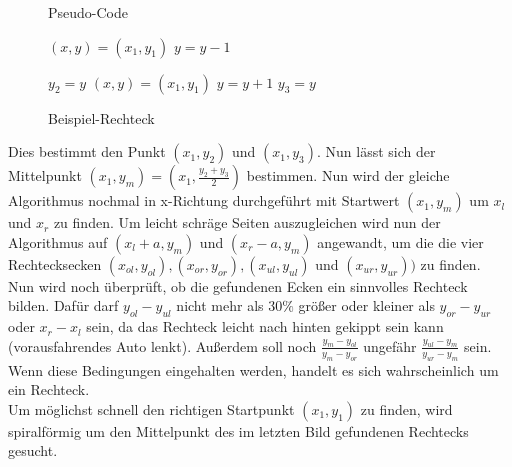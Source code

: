 \begin{figure}[h]
  \centering
\begin{minipage}[t]{0.5\textwidth}
\centering
\vspace{-0.4cm}
\renewcommand\figurename{Algorithm}
\begin{algorithm}[H]
\caption{Pseudo-Code}\label{euclid}
\begin{algorithmic}[1]
\State $(x,y) = (x_1, y_1)$
	\State $ y = y - 1$
\EndWhile

\State $ y_2 = y$
\State $(x,y) = (x_1, y_1)$
	\State $ y = y + 1$
\EndWhile
\State $y_3 = y$
\end{algorithmic}
\end{algorithm}

\end{minipage}\hfill
  \begin{minipage}[t]{0.35\textwidth}
    \centering
    \vspace{-0.2cm}
    \caption{Beispiel-Rechteck}\label{fig:xx}
  \end{minipage}\hfill

\end{figure}


Dies bestimmt den Punkt $(x_1,y_2)$ und $(x_1,y_3)$. Nun lässt sich der Mittelpunkt $(x_1,y_m)=(x_1,\frac{y_2+y_3}{2})$ bestimmen. Nun wird der gleiche Algorithmus nochmal in x-Richtung durchgeführt mit Startwert $(x_1,y_m)$ um $x_l$ und $x_r$ zu finden. Um leicht schräge Seiten auszugleichen wird nun der Algorithmus auf $(x_l+a,y_m)$ und $(x_r-a,y_m)$ angewandt, um die die vier Rechtecksecken $(x_{ol},y_{ol}),(x_{or},y_{or}),(x_{ul},y_{ul})$ und $(x_{ur},y_{ur}))$ zu finden.\\

Nun wird noch überprüft, ob die gefundenen Ecken ein sinnvolles Rechteck bilden. Dafür darf $y_{ol}-y_{ul}$ nicht mehr als $ 30\% $ größer oder kleiner als $y_{or}-y_{ur}$ oder $x_r-x_l$ sein, da das Rechteck leicht nach hinten gekippt sein kann (vorausfahrendes Auto lenkt). Außerdem soll noch $\frac{y_m-y_{ol}}{y_m-y_{or}}$ ungefähr $\frac{y_{ul}-y_{m}}{y_{ur}-y_{m}}$ sein. Wenn diese Bedingungen eingehalten werden, handelt es sich wahrscheinlich um ein Rechteck.\\

Um möglichst schnell den richtigen Startpunkt $(x_1,y_1)$ zu finden, wird spiralförmig um den Mittelpunkt des im letzten Bild gefundenen Rechtecks gesucht.

